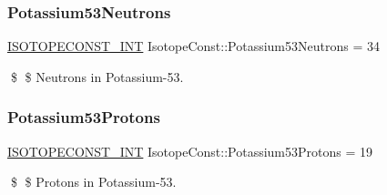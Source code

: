\subsubsection{\texorpdfstring{Potassium53\+Neutrons}{Potassium53Neutrons}}
{\footnotesize\ttfamily \mbox{\hyperlink{group___isotope_const-_macros_ga5f18360b3e99483a35c32d789e62621c}{I\+S\+O\+T\+O\+P\+E\+C\+O\+N\+S\+T\+\_\+\+I\+NT}} Isotope\+Const\+::\+Potassium53\+Neutrons = 34}

\$ \$ Neutrons in Potassium-\/53. \mbox{\label{group___isotope_const-_potassium-_k53_gadd5eff034d46a471de435ec6a00eb1cc}} 
\subsubsection{\texorpdfstring{Potassium53\+Protons}{Potassium53Protons}}
{\footnotesize\ttfamily \mbox{\hyperlink{group___isotope_const-_macros_ga5f18360b3e99483a35c32d789e62621c}{I\+S\+O\+T\+O\+P\+E\+C\+O\+N\+S\+T\+\_\+\+I\+NT}} Isotope\+Const\+::\+Potassium53\+Protons = 19}

\$ \$ Protons in Potassium-\/53. 